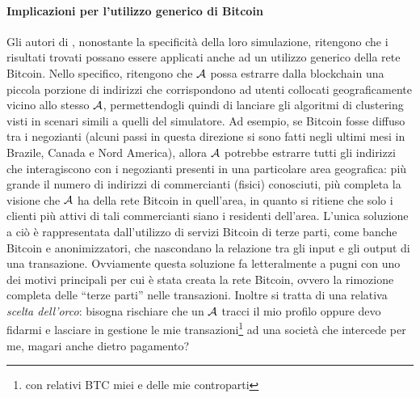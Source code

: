 \paragraph{Implicazioni per l'utilizzo generico di Bitcoin}

Gli autori di \cite{user-privacy}, nonostante la specificità della loro simulazione, ritengono che i risultati trovati possano essere applicati anche ad un utilizzo generico della rete Bitcoin.
Nello specifico, ritengono che $\mathcal{A}$ possa estrarre dalla blockchain una piccola porzione di indirizzi che corrispondono ad utenti collocati geograficamente vicino allo stesso $\mathcal{A}$, permettendogli quindi di lanciare gli algoritmi di clustering visti in scenari simili a quelli del simulatore.
Ad esempio, se Bitcoin fosse diffuso tra i negozianti (alcuni passi in questa direzione si sono fatti negli ultimi mesi in Brazile, Canada e Nord America), allora $\mathcal{A}$ potrebbe estrarre tutti gli indirizzi che interagiscono con i negozianti presenti in una particolare area geografica: più grande il numero di indirizzi di commercianti (fisici) conosciuti, più completa la visione che $\mathcal{A}$ ha della rete Bitcoin in quell'area, in quanto si ritiene che solo i clienti più attivi di tali commercianti siano i residenti dell'area.
L'unica soluzione a ciò è rappresentata dall'utilizzo di servizi Bitcoin di terze parti, come banche Bitcoin e anonimizzatori, che nascondano la relazione tra gli input e gli output di una transazione. Ovviamente questa soluzione fa letteralmente a pugni con uno dei motivi principali per cui è stata creata la rete Bitcoin, ovvero la rimozione completa delle ``terze parti'' nelle transazioni. Inoltre si tratta di una relativa \emph{scelta dell'orco}: bisogna rischiare che un $\mathcal{A}$ tracci il mio profilo oppure devo fidarmi e lasciare in gestione le mie transazioni\footnote{con relativi BTC miei e delle mie controparti} ad una società che intercede per me, magari anche dietro pagamento?

